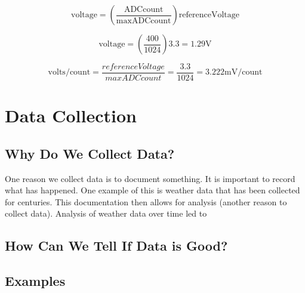 \begin{equation}
	\label{eq:adc2volt}
	\mathrm{voltage} = \left(\frac{\mathrm{ADCcount}}{\mathrm{maxADCcount}}\right)\mathrm{referenceVoltage}
\end{equation}

\begin{equation}
	\label{eq:adc2voltex}
	\mathrm{voltage} = \left(\frac{400}{1024}\right)3.3 = 1.29\mathrm{V}
\end{equation}

\begin{equation}
	\label{eq:adcpercount}
	\mathrm{volts/count} = \frac{referenceVoltage}{maxADCcount} = \frac{3.3}{1024} = 3.222\mathrm{mV}/\mathrm{count}
\end{equation}


\section{Data Collection}

\subsection{Why Do We Collect Data?}
One reason we collect data is to document something. It is important to record what has happened. One example of this 
is weather data that has been collected for centuries. This documentation then allows for analysis (another reason to 
collect data). Analysis of weather data over time led to 

\subsection{How Can We Tell If Data is Good?}

\subsection{Examples}

